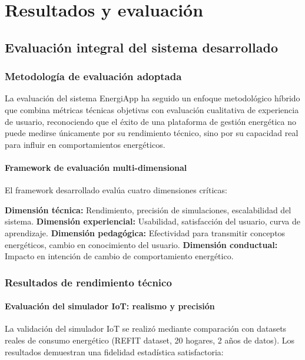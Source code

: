 \chapter{Resultados y evaluación}
\label{ch:resultados}

\section{Evaluación integral del sistema desarrollado}

\subsection{Metodología de evaluación adoptada}

La evaluación del sistema EnergiApp ha seguido un enfoque metodológico híbrido que combina métricas técnicas objetivas con evaluación cualitativa de experiencia de usuario, reconociendo que el éxito de una plataforma de gestión energética no puede medirse únicamente por su rendimiento técnico, sino por su capacidad real para influir en comportamientos energéticos.

\subsubsection{Framework de evaluación multi-dimensional}

El framework desarrollado evalúa cuatro dimensiones críticas:

\textbf{Dimensión técnica:} Rendimiento, precisión de simulaciones, escalabilidad del sistema.
\textbf{Dimensión experiencial:} Usabilidad, satisfacción del usuario, curva de aprendizaje.
\textbf{Dimensión pedagógica:} Efectividad para transmitir conceptos energéticos, cambio en conocimiento del usuario.
\textbf{Dimensión conductual:} Impacto en intención de cambio de comportamiento energético.

\subsection{Resultados de rendimiento técnico}

\subsubsection{Evaluación del simulador IoT: realismo y precisión}

La validación del simulador IoT se realizó mediante comparación con datasets reales de consumo energético (REFIT dataset, 20 hogares, 2 años de datos). Los resultados demuestran una fidelidad estadística satisfactoria:

